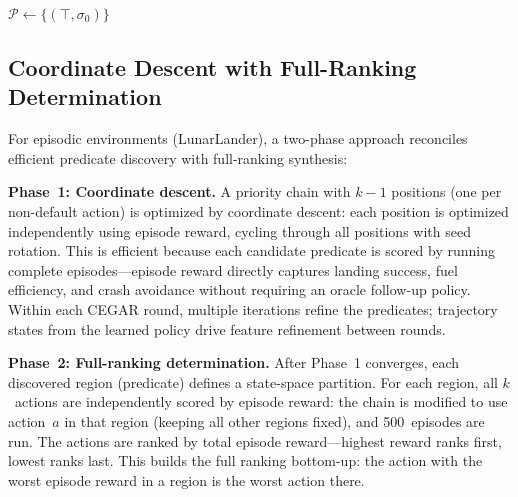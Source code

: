 \documentclass[9pt,a4paper]{article}
\theoremstyle{plain}
\theoremstyle{definition}
\theoremstyle{remark}
\begin{document}
\begin{algorithm}[t]
\SetAlgoLined
{}
$\mathcal{P} \leftarrow \{(\top, \sigma_0)\}$\;
\caption{Flat-Partition CEGAR (stabilization tasks)}
\label{alg:flat-cegar}
\end{algorithm}

\subsection{Coordinate Descent with Full-Ranking Determination}
\label{sec:coorddescent}

For episodic environments (LunarLander), a two-phase approach
reconciles efficient predicate discovery with full-ranking
synthesis:

\textbf{Phase~1: Coordinate descent.}
A priority chain with $k{-}1$ positions (one per non-default
action) is optimized by coordinate descent: each position is
optimized independently using episode reward, cycling through
all positions with seed rotation. This is efficient because
each candidate predicate is scored by running complete
episodes---episode reward directly captures landing
success, fuel efficiency, and crash avoidance without requiring
an oracle follow-up policy. Within each CEGAR round, multiple
iterations refine the predicates; trajectory states from the
learned policy drive feature refinement between rounds.

\textbf{Phase~2: Full-ranking determination.}
After Phase~1 converges, each discovered region (predicate)
defines a state-space partition. For each region, all $k$~actions
are independently scored by episode reward: the chain is modified
to use action~$a$ in that region (keeping all other regions fixed),
and 500~episodes are run. The actions are ranked by total
episode reward---highest reward ranks first, lowest ranks last.
This builds the full ranking bottom-up: the action with the
worst episode reward in a region is the worst action there.
\end{document}
